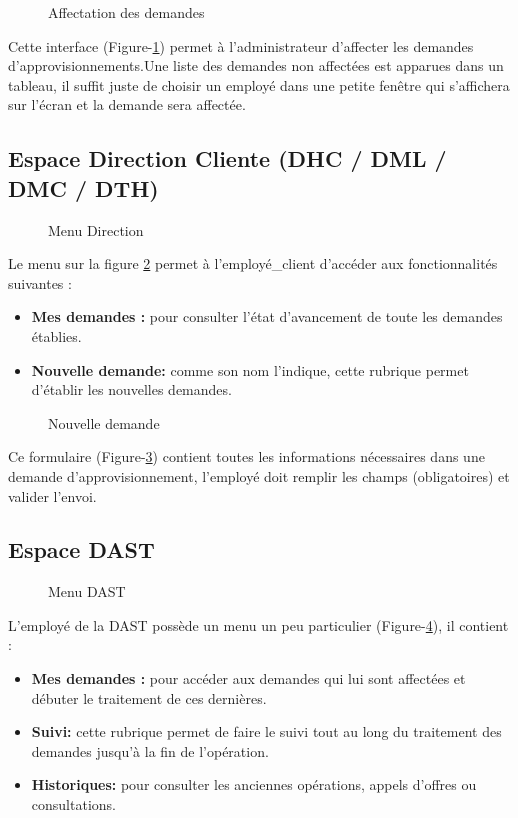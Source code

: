 \documentclass{report}
\begin{document}
\begin{figure}[h]
        \centering
        \caption{Affectation des demandes}
        \label{3}
\end{figure}
Cette interface (Figure-\ref{3}) permet à l'administrateur d'affecter les demandes d'approvisionnements.Une liste des demandes non affectées est apparues dans un tableau, il suffit juste de choisir un employé dans une petite fenêtre qui s'affichera sur l'écran et la demande sera affectée.

\newpage
\subsection{Espace Direction Cliente (DHC / DML / DMC / DTH)}
\begin{figure}[h]
        \centering
        \caption{Menu Direction}
        \label{4}
\end{figure}
\vspace{0.4cm}
Le menu sur la figure \ref{4} permet à l'employé\_client d’accéder aux fonctionnalités suivantes :
\begin{itemize}
    \item \textbf{Mes demandes :} pour consulter l'état d'avancement de toute les demandes établies.
    \item \textbf{Nouvelle demande:} comme son nom l'indique, cette rubrique permet d'établir les nouvelles demandes.
\end{itemize}
\vspace{0.4cm}
\begin{figure}[h]
        \centering
        \caption{Nouvelle demande}
        \label{5}
\end{figure}
Ce formulaire (Figure-\ref{5}) contient toutes les informations nécessaires dans une demande d'approvisionnement, l'employé doit remplir les champs (obligatoires) et valider l'envoi.

\newpage
\subsection{Espace DAST}
\begin{figure}[h]
        \centering
        \caption{Menu DAST}
        \label{6}
\end{figure}
\vspace{0.4cm}
L'employé de la DAST possède un menu un peu particulier (Figure-\ref{6}), il contient :
\begin{itemize}
    \item \textbf{Mes demandes :} pour accéder aux demandes qui lui sont affectées et débuter le traitement de ces dernières.
    \item \textbf{Suivi:} cette rubrique permet de faire le suivi tout au long du traitement des demandes jusqu'à la fin de l'opération.
    \item \textbf{Historiques:} pour consulter les anciennes opérations, appels d'offres ou consultations.
\end{itemize}
\end{document}
